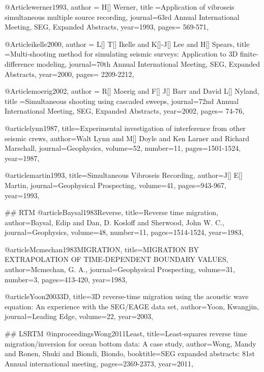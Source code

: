 @Article{werner1993,
  author = {H[] Werner},
  title ={Application of vibroseis simultaneous multiple source recording},
  journal={63rd Annual International Meeting, SEG, Expanded Abstracts},
  year=1993,
  pages={ 569-571},
}

@Article{ikelle2000,
  author = {L[] T[] Ikelle and K[]-J[] Lee and H[] Spears},
  title ={Multi‐shooting method for simulating seismic surveys: Application to 3{D} finite‐difference modeling},
  journal={70th Annual International Meeting, SEG, Expanded Abstracts},
  year=2000,
  pages={ 2209-2212},
}

@Article{moerig2002,
  author = {R[] Moerig and F[] J[] Barr and David L[] Nyland},
  title ={Simultaneous shooting using cascaded sweeps},
  journal={72nd Annual International Meeting, SEG, Expanded Abstracts},
  year=2002,
  pages={ 74-76},
}





@article{lynn1987,
  title={Experimental investigation of interference from other seismic crews},
  author={Walt Lynn and M[] Doyle and Ken Larner and Richard Marschall},
  journal={Geophysics},
  volume={52},
  number={11},
  pages={1501-1524},
  year={1987},
}


@article{martin1993,
  title={Simultaneous Vibroseis Recording},
  author={J[] E[] Martin},
  journal={Geophysical Prospecting},
  volume={41},
  pages={943-967},
  year={1993},
}


## RTM
@article{Baysal1983Reverse,
  title={Reverse time migration},
  author={Baysal, Edip and Dan, D. Kosloff and Sherwood, John W. C.},
  journal={Geophysics},
  volume={48},
  number={11},
  pages={1514-1524},
  year={1983},
}

@article{Mcmechan1983MIGRATION,
  title={MIGRATION BY EXTRAPOLATION OF TIME‐DEPENDENT BOUNDARY VALUES},
  author={Mcmechan, G. A.},
  journal={Geophysical Prospecting},
  volume={31},
  number={3},
  pages={413-420},
  year={1983},
}

@article{Yoon20033D,
  title={3{D} reverse-time migration using the acoustic wave equation: An experience with the SEG/EAGE data set},
  author={Yoon, Kwangjin},
  journal={Leading Edge},
  volume={22},
  year={2003},
}

## LSRTM
@inproceedings{Wong2011Least,
  title={Least‐squares reverse time migration/inversion for ocean bottom data: A case study},
  author={Wong, Mandy and Ronen, Shuki and Biondi, Biondo},
  booktitle={SEG expanded abstracts: 81st Annual international meeting},
  pages={2369-2373},
  year={2011},
}


